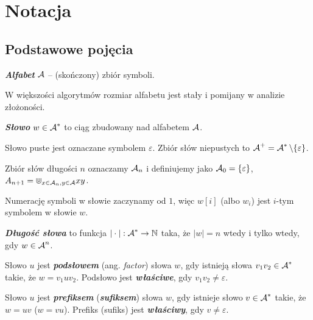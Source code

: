 \section{Notacja}

\subsection{Podstawowe pojęcia}

\begin{definition}{}{}
  {\bf\textit{Alfabet}} $\operatorname{\mathcal{A}}$ -- (skończony) zbiór symboli.
\end{definition}

W większości algorytmów rozmiar alfabetu jest stały i pomijany w analizie złożoności.

\begin{definition}{}{}
  {\bf\textit{Słowo}} $w \in \operatorname{\mathcal{A}}^*$ to ciąg zbudowany nad alfabetem $\operatorname{\mathcal{A}}$.
\end{definition}

Słowo puste jest oznaczane symbolem $\varepsilon$. Zbiór słów niepustych to $\operatorname{\mathcal{A}}^+ = \operatorname{\mathcal{A}}^* \setminus \{\varepsilon\}$.

Zbiór słów długości $n$ oznaczamy $\operatorname{\mathcal{A}}_n$ i definiujemy jako $\operatorname{\mathcal{A}}_0 = \{\varepsilon\}$, $A_{n + 1} = \Cup_{x \in \operatorname{\mathcal{A}}_n, y \in \operatorname{\mathcal{A}}} xy$. 

Numerację symboli w słowie zaczynamy od $1$, więc $w[i]$ (albo $w_i$) jest $i$-tym symbolem w słowie $w$.

\begin{definition}{}{}
  {\bf\textit{Długość słowa}} to funkcja $|\cdot|: \operatorname{\mathcal{A}}^* \to \mathbb{N}$  taka, że $|w| = n$ wtedy i tylko wtedy, gdy $w \in \operatorname{\mathcal{A}}^n$.
\end{definition}

\begin{definition}{}{}
  Słowo $u$ jest {\bf\textit{podsłowem}} (ang. \emph{factor}) słowa $w$, gdy istnieją słowa $v_1 v_2 \in \operatorname{\mathcal{A}}^*$ takie, że $w = v_1 u v_2$.
  Podsłowo jest {\bf\textit{właściwe}}, gdy $v_1 v_2 \neq \varepsilon$.
\end{definition}


\begin{definition}{}{}
  Słowo $u$ jest {\bf\textit{prefiksem}} ({\bf\textit{sufiksem}}) słowa $w$, gdy istnieje słowo $v \in \operatorname{\mathcal{A}}^*$ takie, że $w = u v$ ($w = v u$).
  Prefiks (sufiks) jest {\bf\textit{właściwy}}, gdy $v \neq \varepsilon$.
\end{definition}

